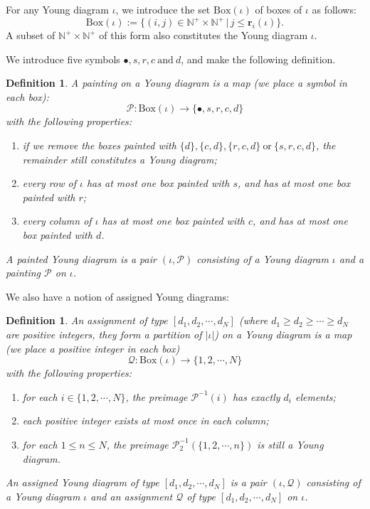 \documentclass[12pt, a4paper]{amsart}
\numberwithin{equation}{section}
\newtheorem{defn}[thm]{Definition}
\newcommand{\br}{{\mathbf{r}}}
\newcommand{\BN}{{\mathbb {N}}}
\newcommand{\CP}{{\mathcal {P}}}
\newcommand{\CQ}{{\mathcal {Q}}}
\newcommand{\set}[2]{\{#1\,|\,#2\}}
\begin{document}
For any Young diagram $\iota$, we introduce the set $\mathrm{Box}(\iota)$ of boxes of $\iota$ as follows:
\begin{equation}
   \mathrm{Box}(\iota) := \set{(i,j) \in \BN^{+} \times \BN^{+}}{j \leq \br_i(\iota)}.
\end{equation}
A subset of $\BN^{+} \times \BN^{+}$ of this form also constitutes the Young diagram $\iota$.

We introduce five symbols $\bullet, s, r, c \ \textrm{and} \ d$, and make the following definition.

\begin{defn}
   A painting on a Young diagram is a map (we place a symbol in each box):
   $$\CP : \mathrm{Box}(\iota) \to \{ \bullet, s, r ,c ,d \}$$
   with the following properties:

   \begin{enumerate}
      \item if we remove the boxes painted with $\{d\}, \{c,d\}, \{r,c,d\} \ \textrm{or} \  \{s ,r ,c ,d\}$, the remainder still constitutes a Young diagram;
      \item every row of $\iota$ has at most one box painted with $s$, and has at most one box painted with $r$;
      \item every column of $\iota$ has at most one box painted with $c$, and has at most one box painted with $d$.
   \end{enumerate}
   A painted Young diagram is a pair $(\iota, \CP)$ consisting of a Young diagram $\iota$ and a painting $\CP$ on $\iota$.
\end{defn}


We also have a notion of assigned Young diagrams:


\begin{defn}
   An assignment of type $[d_1,d_2, \cdots, d_N]$ (where $d_1 \geq d_2 \geq \cdots \geq d_N$ are positive integers, they form a partition of $|\iota|$) on a Young diagram is a map (we place a positive integer in each box)
   $$\CQ: \mathrm{Box}(\iota) \to \{1,2,\cdots,N\} $$
   with the following properties:

   \begin{enumerate}
      \item for each $i \in \{1,2,\cdots,N\}$, the preimage $\CP^{-1}(i)$ has exactly $d_i$ elements;
      \item each positive integer exists at most once in each column;
      \item for each $1 \leq n \leq N$, the preimage $\CP_2^{-1}(\{1,2,\cdots,n\})$ is still a Young diagram.
   \end{enumerate}
   An assigned Young diagram of type $[d_1,d_2, \cdots, d_N]$ is a pair $(\iota,\CQ)$ consisting of a Young diagram $\iota$ and an assignment $\CQ$ of type $[d_1,d_2, \cdots, d_N]$ on $\iota$.
\end{defn}
\end{document}
